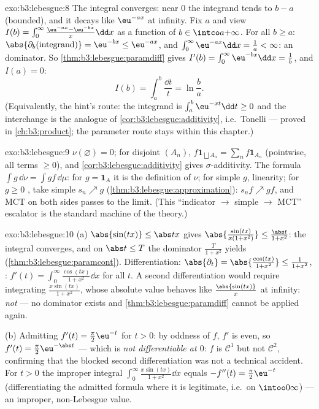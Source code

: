 \begin{solution}{exo:b3:lebesgue:8}
The integral converges: near $0$ the integrand tends to $b - a$
(bounded), and it decays like $\eu^{-ax}$ at infinity. Fix $a$
and view $I(b) = \int_0^\infty\frac{\eu^{-ax} -
\eu^{-bx}}x\dd x$ as a function of $b \in \intco a{+\infty}$.
For all $b \geq a$: $\abs{\partial_b(\text{integrand})} =
\eu^{-bx} \leq \eu^{-ax}$, and $\int_0^\infty\eu^{-ax}\dd x =
\frac1a < \infty$: an  dominator. So
\cref{thm:b3:lebesgue:paramdiff} gives $I'(b) =
\int_0^\infty\eu^{-bx}\dd x = \frac1b$, and $I(a) = 0$:
\[
I(b) = \int_a^b\frac{\dd t}t = \ln\frac ba .
\]
(Equivalently, the hint's route: the integrand is
$\int_a^b\eu^{-xt}\dd t \geq 0$ and the interchange is the
 analogue of \cref{cor:b3:lebesgue:additivity},
i.e.\ Tonelli --- proved in \cref{ch:b3:product}; the
parameter route stays within this chapter.)
\end{solution}

\begin{solution}{exo:b3:lebesgue:9}
$\nu(\varnothing) = 0$; for disjoint $(A_n)$, $f\mathbf
1_{\bigsqcup A_n} = \sum_nf\mathbf 1_{A_n}$ (pointwise, all
terms $\geq 0$), and \cref{cor:b3:lebesgue:additivity} gives
$\sigma$-additivity. The formula $\int g\,\dd\nu = \int
gf\,\dd\mu$: for $g = \mathbf 1_A$ it is the definition of
$\nu$; for simple $g$, linearity; for $g \geq 0$ ,
take simple $s_n \nearrow g$
(\cref{thm:b3:lebesgue:approximation}): $s_nf \nearrow gf$, and
MCT on both sides passes to the limit. (This ``indicator
$\to$ simple $\to$ MCT'' escalator is the standard machine of
the theory.)
\end{solution}

\begin{solution}{exo:b3:lebesgue:10}
(a) $\abs{\sin(tx)} \leq \abs tx$ gives
$\abs{\frac{\sin(tx)}{x(1+x^2)}} \leq \frac{\abs
t}{1+x^2}$: the integral converges, and on $\abs t \leq T$ the
dominator $\frac{T}{1+x^2}$ yields 
(\cref{thm:b3:lebesgue:paramcont}). Differentiation:
$\abs{\partial_t} = \abs{\frac{\cos(tx)}{1+x^2}} \leq
\frac1{1+x^2}$, : $f'(t) =
\int_0^\infty\frac{\cos(tx)}{1+x^2}\dd x$ for all $t$. A second
differentiation would require integrating $\frac{x\sin(tx)}{1 +
x^2}$, whose absolute value behaves like $\frac{\abs{\sin(tx)}}
x$ at infinity: \emph{not}  --- no dominator exists
and \cref{thm:b3:lebesgue:paramdiff} cannot be applied again.

(b) Admitting $f'(t) = \frac\pi2\eu^{-t}$ for $t > 0$: by
oddness of $f$, $f'$ is even, so $f'(t) =
\frac\pi2\eu^{-\abs t}$ --- which is \emph{not differentiable
at $0$}: $f$ is $\mathcal C^1$ but not $\mathcal C^2$,
confirming that the blocked second differentiation was not a
technical accident. For $t > 0$ the improper integral
$\int_0^\infty\frac{x\sin(tx)}{1+x^2}\dd x$ equals $-f''(t) =
\frac\pi2\eu^{-t}$ (differentiating the admitted formula where
it is legitimate, i.e.\ on $\intoo0\infty$) --- an improper,
non-Lebesgue value.
\end{solution}

